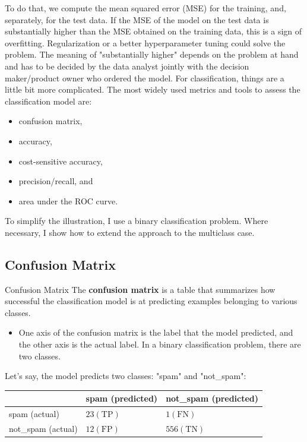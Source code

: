 \documentclass[8pt,dvipsnames]{beamer}
\begin{document}
\begin{frame}
	To do that, we compute the mean squared error (MSE) for the training, and, separately, for the test data. If the MSE of the model on the test data is substantially higher than the MSE obtained on the training data, this is a sign of overfitting. Regularization or a better hyperparameter tuning could solve the problem. The meaning of "substantially higher" depends on the problem at hand and has to be decided by the data analyst jointly with the decision maker/product owner who ordered the model. For classification, things are a little bit more complicated. The most widely used metrics and tools to assess the classification model are:
	\begin{itemize}
		\item confusion matrix,
		\item accuracy,
		\item cost-sensitive accuracy,
		\item precision/recall, and
		\item area under the ROC curve.
	\end{itemize}
	To simplify the illustration, I use a binary classification problem. Where necessary, I show how to extend the approach to the multiclass case.
\end{frame}

\subsection{Confusion Matrix}
\begin{frame}{Confusion Matrix}
	The \textbf{confusion matrix }is a table that summarizes how successful the classification model is at predicting examples belonging to various classes.
	\begin{itemize}
		\item One axis of the confusion matrix is the label that the model predicted, and the other axis is the actual label. In a binary classification problem, there are two classes.
	\end{itemize}
	Let's say, the model predicts two classes: "spam" and "not\_spam":

	\begin{center}
		\begin{tabular}{lll}
			\hline               & spam (predicted)  & not\_spam (predicted) \\
			\hline spam (actual) & $23(\mathrm{TP})$ & $1(\mathrm{FN})$      \\
			not\_spam (actual)   & $12(\mathrm{FP})$ & $556(\mathrm{TN})$    \\
			\hline
		\end{tabular}
	\end{center}

\end{frame}
\end{document}
